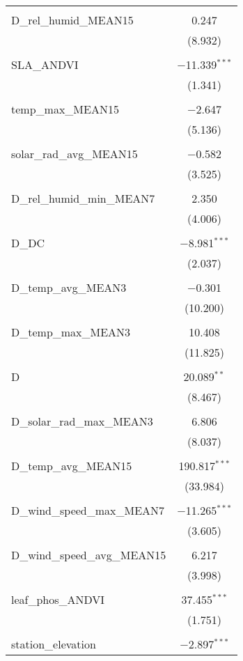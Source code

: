 \begin{table}[!htbp]
\begin{tabular}{@{\extracolsep{5pt}}lc}
  & \\ 
 D\_rel\_humid\_MEAN15 & 0.247 \\ 
  & (8.932) \\ 
  & \\ 
 SLA\_ANDVI & $-$11.339$^{***}$ \\ 
  & (1.341) \\ 
  & \\ 
 temp\_max\_MEAN15 & $-$2.647 \\ 
  & (5.136) \\ 
  & \\ 
 solar\_rad\_avg\_MEAN15 & $-$0.582 \\ 
  & (3.525) \\ 
  & \\ 
 D\_rel\_humid\_min\_MEAN7 & 2.350 \\ 
  & (4.006) \\ 
  & \\ 
 D\_DC & $-$8.981$^{***}$ \\ 
  & (2.037) \\ 
  & \\ 
 D\_temp\_avg\_MEAN3 & $-$0.301 \\ 
  & (10.200) \\ 
  & \\ 
 D\_temp\_max\_MEAN3 & 10.408 \\ 
  & (11.825) \\ 
  & \\ 
 D & 20.089$^{**}$ \\ 
  & (8.467) \\ 
  & \\ 
 D\_solar\_rad\_max\_MEAN3 & 6.806 \\ 
  & (8.037) \\ 
  & \\ 
 D\_temp\_avg\_MEAN15 & 190.817$^{***}$ \\ 
  & (33.984) \\ 
  & \\ 
 D\_wind\_speed\_max\_MEAN7 & $-$11.265$^{***}$ \\ 
  & (3.605) \\ 
  & \\ 
 D\_wind\_speed\_avg\_MEAN15 & 6.217 \\ 
  & (3.998) \\ 
  & \\ 
 leaf\_phos\_ANDVI & 37.455$^{***}$ \\ 
  & (1.751) \\ 
  & \\ 
 station\_elevation & $-$2.897$^{***}$ \\ 

\end{tabular}
\end{table}
